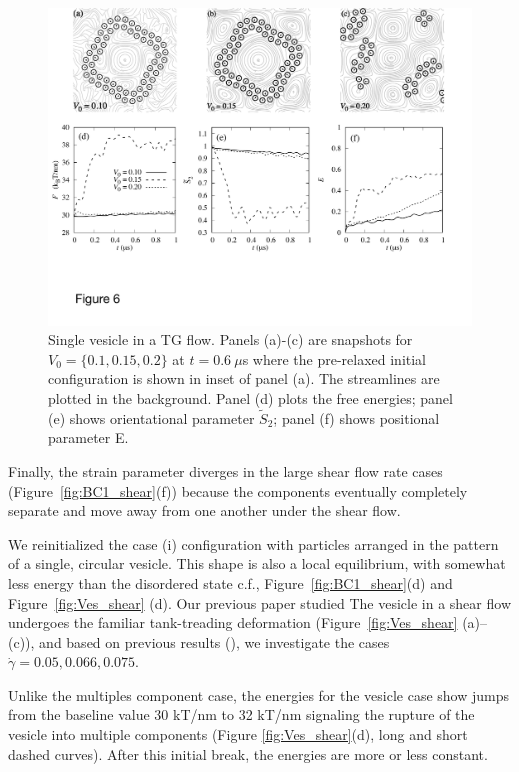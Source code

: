 \documentclass[prb,preprint,showpacs,preprintnumbers,amsmath,amssymb,longbibliography]{revtex4-1}
\begin{document}
\begin{figure}
  \begin{center}
    \includegraphics[width=1.0\textwidth]{Figures/Figure6.pdf}        
  \end{center}
\caption{\label{fig:ves_TG} Single vesicle in a TG flow. Panels (a)-(c) are snapshots for $V_0=\{0.1, 0.15, 0.2\}$ at $t=0.6\ \mu$s where the pre-relaxed initial configuration is shown in inset of panel (a). The streamlines are plotted in the background.
Panel (d) plots the free energies; panel (e) shows orientational parameter $\tilde{S}_2$; panel (f) shows positional parameter E.
}
\end{figure}


Finally, the strain parameter diverges in the large shear flow rate cases (Figure~\ref{fig:BC1_shear}(f))
because the components eventually completely separate and move away from one another
under the shear flow.

We reinitialized the case (i) configuration with particles arranged in the pattern of a single, circular vesicle.
This shape is also a local equilibrium, with somewhat less energy than the disordered state c.f.,
Figure~\ref{fig:BC1_shear}(d) and Figure~\ref{fig:Ves_shear} (d).
Our previous paper \cite{Fu2022_JFM} studied
The vesicle in a shear flow undergoes the familiar tank-treading deformation (Figure~\ref{fig:Ves_shear} (a)--(c)),
and based on previous results (\cite{Fu2022_JFM}),
we investigate the cases $\dot\gamma=0.05, 0.066, 0.075$.

Unlike the multiples component case, 
the energies for the vesicle case show jumps from the baseline value $30$ kT/nm to 32 kT/nm
signaling the rupture of the vesicle into multiple components
(Figure \ref{fig:Ves_shear}(d), long and short dashed curves).
After this initial break, the energies are more or less constant.
\end{document}
